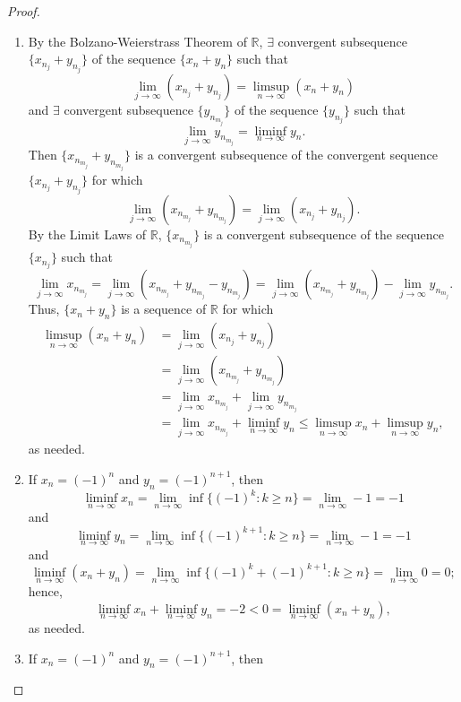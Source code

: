 \documentclass[12pt]{article}
\theoremstyle{definition}
\begin{document}
\begin{proof}
\begin{enumerate}[label=\alph*)]
        as needed.
        \item By the Bolzano-Weierstrass Theorem of $\mathbb{R}$, $\exists$ convergent subsequence $\{x_{n_j} + y_{n_j}\}$ of the sequence $\{x_n + y_n\}$ such that
        \[
            \lim_{j \to \infty}(x_{n_j} + y_{n_j}) = \limsup_{n \to \infty}(x_n + y_n)
        \]
        and $\exists$ convergent subsequence $\{y_{n_{m_j}}\}$ of the sequence $\{y_{n_j}\}$ such that
        \[
            \lim_{j \to \infty}y_{n_{m_j}} = \liminf_{n \to \infty}y_n.
        \]
        Then $\{x_{n_{m_j}} + y_{n_{m_j}}\}$ is a convergent subsequence of the convergent sequence $\{x_{n_j} + y_{n_j}\}$ for which
        \[
            \lim_{j \to \infty}(x_{n_{m_j}} + y_{n_{m_j}}) = \lim_{j \to \infty}(x_{n_j} + y_{n_j}).
        \]
        By the Limit Laws of $\mathbb{R}$, $\{x_{n_{m_j}}\}$ is a convergent subsequence of the sequence $\{x_{n_j}\}$ such that
        \[
            \lim_{j \to \infty}x_{n_{m_j}} = \lim_{j \to \infty}(x_{n_{m_j}} + y_{n_{m_j}} - y_{n_{m_j}}) = \lim_{j \to \infty}(x_{n_{m_j}} + y_{n_{m_j}}) - \lim_{j \to \infty}y_{n_{m_j}}.
        \]
        Thus, $\{x_n + y_n\}$ is a sequence of $\mathbb{R}$ for which
        \begin{align*}
            \limsup_{n \to \infty}(x_n + y_n) &= \lim_{j \to \infty}(x_{n_j} + y_{n_j}) \\
            &= \lim_{j \to \infty}(x_{n_{m_j}} + y_{n_{m_j}}) \\ 
            &= \lim_{j \to \infty}x_{n_{m_j}} + \lim_{j \to \infty}y_{n_{m_j}} \\
            &= \lim_{j \to \infty}x_{n_{m_j}} + \liminf_{n \to \infty}y_n \leq \limsup_{n \to \infty}x_n + \limsup_{n \to \infty}y_n,
        \end{align*}
        as needed.
        \item If $x_n = (-1)^n$ and $y_n = (-1)^{n + 1}$,  then
        \[
            \liminf_{n \to \infty}x_n = \lim_{n \to \infty}\inf\{(-1)^k : k \geq n\} = \lim_{n \to \infty}-1 = -1 
        \]
        and
        \[
            \liminf_{n \to \infty}y_n = \lim_{n \to \infty}\inf\{(-1)^{k + 1} : k \geq n\} = \lim_{n \to \infty}-1 = -1 
        \]
        and 
        \[
            \liminf_{n \to \infty}(x_n + y_n) = \lim_{n \to \infty}\inf\{(-1)^k + (-1)^{k +1} : k \geq n\} = \lim_{n \to \infty}0 = 0;
        \]
        hence,
        \[
            \liminf_{n \to \infty}x_n + \liminf_{n \to \infty}y_n = -2 < 0 = \liminf_{n \to \infty}(x_n + y_n),
        \]
        as needed.
        \item If $x_n = (-1)^n$ and $y_n = (-1)^{n + 1}$, then

\end{enumerate}
\end{proof}
\end{document}
